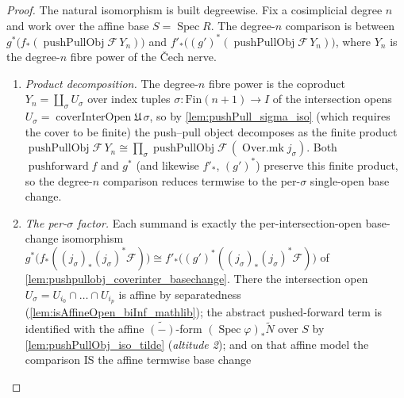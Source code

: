 \begin{proof}
  The natural isomorphism is built degreewise. Fix a cosimplicial degree \(n\) and work over
  the affine base \(S = \operatorname{Spec} R\). The degree-\(n\) comparison is between
  \(g^*\bigl(f_*(\operatorname{pushPullObj}\mathcal{F}\, Y_n)\bigr)\) and
  \(f'_*\bigl((g')^*(\operatorname{pushPullObj}\mathcal{F}\, Y_n)\bigr)\), where \(Y_n\) is the
  degree-\(n\) fibre power of the {\v C}ech nerve.
  \begin{enumerate}
    \item \emph{Product decomposition.} The degree-\(n\) fibre power is the coproduct
      \(Y_n = \coprod_\sigma U_\sigma\) over index tuples \(\sigma : \mathrm{Fin}(n+1) \to I\)
      of the intersection opens \(U_\sigma = \operatorname{coverInterOpen}\mathfrak{U}\,\sigma\),
      so by \cref{lem:pushPull_sigma_iso} (which requires the cover to be finite) the
      push--pull object decomposes as the finite product \(\operatorname{pushPullObj}\mathcal{F}\,
      Y_n \cong \prod_\sigma \operatorname{pushPullObj}\mathcal{F}\,(\operatorname{Over.mk}
      j_\sigma)\). Both \(\operatorname{pushforward} f\) and \(g^*\) (and likewise \(f'_*\),
      \((g')^*\)) preserve this finite product, so the degree-\(n\) comparison reduces termwise
      to the per-\(\sigma\) single-open base change.
    \item \emph{The per-\(\sigma\) factor.} Each summand is exactly the per-intersection-open
      base-change isomorphism \(g^*\bigl(f_*((j_\sigma)_*(j_\sigma)^*\mathcal{F})\bigr) \cong
      f'_*\bigl((g')^*((j_\sigma)_*(j_\sigma)^*\mathcal{F})\bigr)\) of
      \cref{lem:pushpullobj_coverinter_basechange}. There the intersection open
      \(U_\sigma = U_{i_0} \cap \dots \cap U_{i_p}\) is affine by separatedness
      (\cref{lem:isAffineOpen_biInf_mathlib}); the abstract pushed-forward term is identified
      with the affine \(\widetilde{(-)}\)-form \((\operatorname{Spec}\varphi)_*\widetilde{N}\)
      over \(S\) by \cref{lem:pushPullObj_iso_tilde} (\emph{altitude 2}); and on that affine
      model the comparison IS the affine termwise base change

\end{enumerate}
\end{proof}
